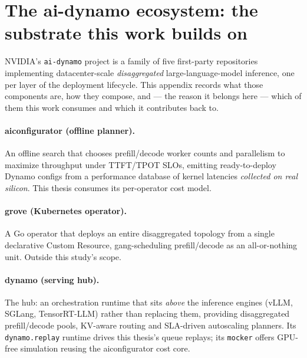 \section[The ai-dynamo ecosystem]{The ai-dynamo ecosystem: the substrate this
work builds on}
\label{app:ecosystem}

NVIDIA's \texttt{ai-dynamo} project is a family of five first-party
repositories implementing datacenter-scale \emph{disaggregated}
large-language-model inference, one per layer of the deployment lifecycle. This
appendix records what those components are, how they compose, and --- the reason
it belongs here --- which of them this work consumes and which it contributes
back to.

\paragraph{aiconfigurator (offline planner).} An offline search that chooses
prefill/decode worker counts and parallelism to maximize throughput under
TTFT/TPOT SLOs, emitting ready-to-deploy Dynamo configs from a performance
database of kernel latencies \emph{collected on real silicon}. This thesis
consumes its per-operator cost model.

\paragraph{grove (Kubernetes operator).} A Go operator that deploys an entire
disaggregated topology from a single declarative Custom Resource, gang-scheduling
prefill/decode as an all-or-nothing unit. Outside this study's scope.

\paragraph{dynamo (serving hub).} The hub: an orchestration runtime that sits
\emph{above} the inference engines (vLLM, SGLang, TensorRT-LLM) rather than
replacing them, providing disaggregated prefill/decode pools, KV-aware routing
and SLA-driven autoscaling planners. Its \texttt{dynamo.replay} runtime drives
this thesis's queue replays; its \texttt{mocker} offers GPU-free simulation
reusing the aiconfigurator cost core.

